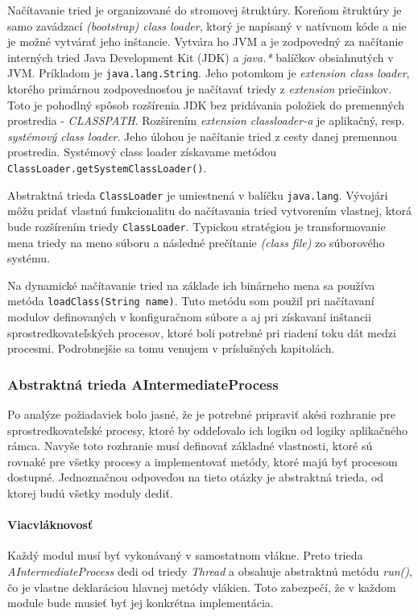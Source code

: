 Načítavanie tried je organizované do stromovej štruktúry. Koreňom štruktúry je samo zavádzací 
\emph{(bootstrap) class loader}, ktorý je napísaný v natívnom kóde a nie je možné vytvárať jeho inštancie. 
Vytvára ho 
JVM a je zodpovedný za načítanie interných tried Java Development Kit (JDK) a \emph{java.*} balíčkov 
obsiahnutých v JVM. Príkladom je \verb|java.lang.String|. Jeho potomkom je \emph{extension class loader},
ktorého primárnou zodpovednosťou je načítavať triedy z \emph{extension} priečinkov. Toto je pohodlný 
spôsob rozšírenia JDK bez pridávania položiek do premenných prostredia - \emph{CLASSPATH}. 
Rozšírením \emph{extension classloader-a} je aplikačný, resp. \emph{systémový class loader}. Jeho úlohou 
je načítanie tried z cesty danej premennou prostredia. Systémový class loader získavame metódou 
\verb|ClassLoader.getSystemClassLoader()|. \citep{techjava, antl}

Abstraktná trieda \verb|ClassLoader| je umiestnená v balíčku \verb|java.lang|. Vývojári môžu pridať 
vlastnú 
funkcionalitu do načítavania tried vytvorením vlastnej, ktorá bude rozšírením triedy 
\verb|ClassLoader|. Typickou stratégiou je transformovanie mena triedy na meno súboru a následné 
prečítanie  \emph{(class file)} zo súborového systému. \citep{christudas, classloader}

Na dynamické načítavanie tried na základe ich binárneho mena sa používa metóda \verb|loadClass(String name)|.
Tuto metódu som použil pri načítavaní modulov definovaných v konfiguračnom súbore a aj pri získavaní 
inštancii sprostredkovateľských procesov, ktoré boli potrebné pri riadení toku dát medzi procesmi.
Podrobnejšie sa tomu venujem v príslušných kapitolách. 



\subsubsection{Abstraktná trieda AIntermediateProcess} 

Po analýze požiadaviek bolo jasné, že je potrebné pripraviť akési rozhranie pre sprostredkovateľské 
procesy, ktoré by oddeľovalo ich logiku od logiky aplikačného rámca. Navyše toto rozhranie musí 
definovať základné vlastnosti, ktoré sú rovnaké pre všetky procesy a implementovať metódy, ktoré 
majú byť procesom dostupné. Jednoznačnou odpoveďou na tieto otázky je abstraktná trieda, 
od ktorej budú všetky moduly dediť. 


\paragraph{Viacvláknovosť}
Každý modul musí byť vykonávaný v samostatnom vlákne. Preto trieda \emph{AIntermediateProcess} dedi
od triedy \emph{Thread} a obsahuje abstraktnú metódu \emph{run()}, čo je vlastne deklaráciou 
hlavnej metódy vlákien. Toto zabezpečí, že v každom module bude musieť byť jej konkrétna implementácia.



